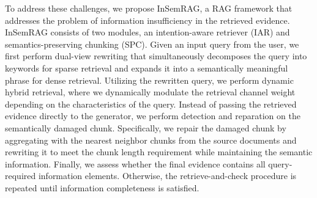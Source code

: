To address these challenges, we propose InSemRAG, a RAG framework that addresses the problem of information insufficiency in the retrieved evidence. 
%
%
%
InSemRAG consists of two modules, an intention-aware retriever (IAR) and semantics-preserving chunking (SPC).
Given an input query from the user, we first perform dual-view rewriting that simultaneously decomposes the query into keywords for sparse retrieval and expands it into a semantically meaningful phrase for dense retrieval. 
Utilizing the rewritten query, we perform dynamic hybrid retrieval, where we dynamically modulate the retrieval channel weight depending on the characteristics of the query.
Instead of passing the retrieved evidence directly to the generator, we perform detection and reparation on the semantically damaged chunk.
Specifically, we repair the damaged chunk by aggregating with the nearest neighbor chunks from the source documents and rewriting it to meet the chunk length requirement while maintaining the semantic information.
Finally, we assess whether the final evidence contains all query-required information elements.
Otherwise, the retrieve-and-check procedure is repeated until information completeness is satisfied.
